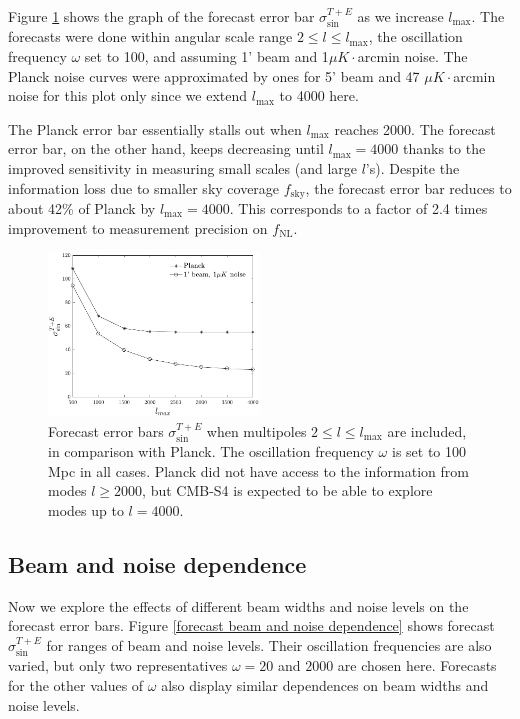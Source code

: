 Figure \ref{forecast lmax dependence} shows the graph of the forecast error bar $\sigma_{\sin}^{T+E}$ as we increase $l_\text{max}$. The forecasts were done within angular scale range $2\le l \le l_\text{max}$, the oscillation frequency $\omega$ set to 100, and assuming 1' beam and 1$\mu K\cdot$arcmin noise. The Planck noise curves were approximated by ones for 5' beam and 47 $\mu K\cdot$arcmin noise for this plot only since we extend $l_\text{max}$ to 4000 here. 

The Planck error bar essentially stalls out when $l_\text{max}$ reaches 2000. The forecast error bar, on the other hand, keeps decreasing until $l_\text{max}=4000$ thanks to the improved sensitivity in measuring small scales (and large $l$'s). Despite the information loss due to smaller sky coverage $f_\text{sky}$, the forecast error bar reduces to about 42\% of Planck by $l_\text{max}=4000$. This corresponds to a factor of 2.4 times improvement to measurement precision on $f_\text{NL}$.

\begin{figure}[ht]
	\centering
	\includegraphics[width=0.5\textwidth]{lmax_dependence.pdf}
	\caption{Forecast error bars $\sigma_{\sin}^{T+E}$ when multipoles $2\le l \le l_\text{max}$ are included, in comparison with Planck. The oscillation frequency $\omega$ is set to 100 Mpc in all cases. Planck did not have access to the information from modes $l\ge 2000$, but CMB-S4 is expected to be able to explore modes up to $l=4000$.}
	\label{forecast lmax dependence}
\end{figure}

\subsection{Beam and noise dependence}

Now we explore the effects of different beam widths and noise levels on the forecast error bars. Figure \ref{forecast beam and noise dependence} shows forecast $\sigma_{\sin}^{T+E}$ for ranges of beam and noise levels. Their oscillation frequencies are also varied, but only two representatives $\omega=20$ and $2000$ are chosen here. Forecasts for the other values of $\omega$ also display similar dependences on beam widths and noise levels.

